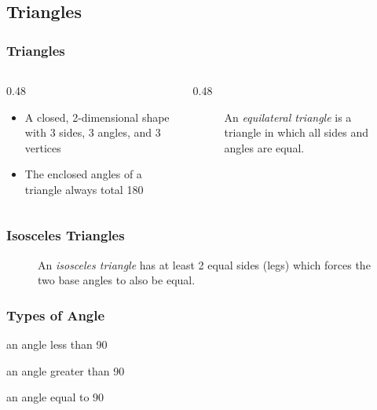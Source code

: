 \subsection{Triangles}

\begin{frame}
	\frametitle{Triangles}

    \begin{columns}
        \begin{column}{0.48\linewidth}
            \begin{itemize}[<+- | alert@+>]
                \item A closed, 2-dimensional shape with 3 sides, 3 angles, and 3 vertices
                \item The enclosed angles of a triangle always total 180\textdegree{}
            \end{itemize}
        \end{column}
        \begin{column}{0.48\linewidth}
            \begin{figure}
                \centering
                \resizebox{0.75\linewidth}{!}{
                    
                }

                \vspace{0.5em}
                {\footnotesize An \emph{equilateral triangle} is a triangle in which all sides and angles are equal.\par}
            \end{figure}
        \end{column}
    \end{columns}
\end{frame}

\begin{frame}
	\frametitle{Isosceles Triangles}

    \begin{figure}
        \centering
        \resizebox{0.75\linewidth}{!}{
            
        }

        \vspace{0.5em}
        {\footnotesize An \emph{isosceles triangle} has at least 2 equal sides (legs) which forces the two base angles to also be equal.\par}
    \end{figure}
\end{frame}

\begin{frame}
	\frametitle{Types of Angle}

    \begin{description}[<+- | alert@+>]
        \item[Acute] an angle less than 90\textdegree{}
        \item[Obtuse] an angle greater than 90\textdegree{}
        \item[Right Angle] an angle equal to 90\textdegree{}
    \end{description}
\end{frame}

